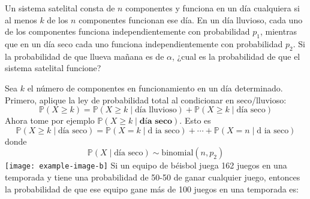 \question%
	Un sistema satelital consta de $n$ componentes y funciona en un día cualquiera si al menos $k$ de los $n$ componentes funcionan ese día. En un día lluvioso, cada uno de los componentes funciona independientemente con probabilidad $p_1$, mientras que en un día seco cada uno funciona independientemente con probabilidad $p_2$. Si la probabilidad de que llueva mañana es de $\alpha$, ¿cual es la probabilidad de que el sistema satelital funcione?
	\begin{solutionorlines}
		Sea $k$ el número de componentes en funcionamiento en un día determinado. Primero, aplique la ley de probabilidad total al condicionar en seco/lluvioso:
		\begin{equation*}
		\mathds{P}\left(X\ge k\right)=\mathds{P}\left(X\ge k\mid\text{día lluvioso}\right)+\mathds{P}\left(X\ge k\mid\text{día seco}\right)
		\end{equation*}
		Ahora tome por ejemplo $\mathds{P}\left(X\ge k\mid \textbf{día seco}\right)$. Esto es
		\begin{equation*}
		\mathds{P}\left(X\ge k\mid\text{día seco}\right)=\mathds{P}\left(X=k\mid\text{d
		ia seco}\right)+\cdots+\mathds{P}\left(X=n\mid\text{d
		ia seco}\right)
		\end{equation*}
		donde
		\begin{equation*}
		\mathds{P}\left(X\mid\text{día seco}\right)\sim\mathrm{binomial}\left(n,p_2\right)
		\end{equation*}
		\texttt{[image: example-image-b]}
		\centering
		\label{fig:2}
		\justifying
		Si un equipo de béisbol juega 162 juegos en una temporada y tiene una probabilidad de 50-50 de ganar cualquier juego, entonces la probabilidad de que ese equipo gane más de 100 juegos en una temporada es:
	\end{solutionorlines}
